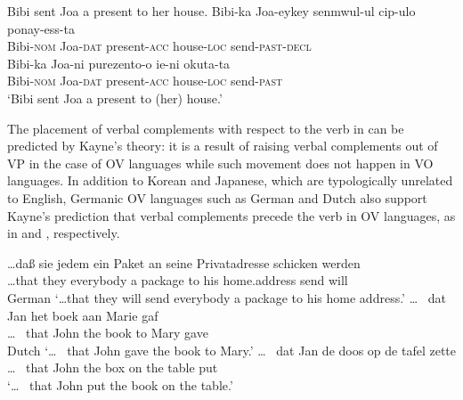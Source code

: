 \ea\label{ex:62}\ea Bibi sent Joa a present to her house.
\ex \gll  Bibi-ka     Joa-eykey senmwul-ul cip-ulo      ponay-ess-ta \\
Bibi-\textsc{nom} Joa-\textsc{dat}  present-\textsc{acc} house-\textsc{loc} send-\textsc{past-decl} \\
\newpage
\ex \gll Bibi-ka     Joa-ni     purezento-o ie-ni   okuta-ta \\
Bibi-\textsc{nom} Joa-\textsc{dat} present-\textsc{acc}  house-\textsc{loc} send-\textsc{past} \\
\glt  ‘Bibi sent Joa a present to (her) house.’
\z \z

The placement of verbal complements with respect to the verb in  can be predicted by Kayne's theory: it is a result of raising verbal complements out of \ac{VP} in the case of \ac{OV} languages while such movement does not happen in \ac{VO} languages. In addition to Korean and Japanese, which are typologically unrelated to English, Germanic \ac{OV} languages such as German and Dutch also support Kayne’s prediction that verbal complements precede the verb in \ac{OV} languages, as in  and , respectively. 

\ea\label{ex:63} \gll \ldots daß  sie    jedem       ein Paket     an seine Privatadresse  schicken werden \\ 
\ldots that they everybody a    package to his     home.address send        will \\ \hfill German
\glt `\ldots that they will send everybody a package to his home address.’  \citep{Haider1992}
\ex\label{ex:64} 
    \ea \gll \ldots~  dat  Jan   het  boek aan Marie gaf \\
\ldots~ that John the book to Mary gave \\ \hfill Dutch
\glt `\ldots~ that John gave the book to Mary.'
    \ex \gll \ldots~  dat  Jan   de doos op de tafel zette \\
\ldots~ that John the box on the table put \\ 
\glt `\ldots~ that John put the book on the table.'   \citep{Barbiers2000}
    \z
\z


